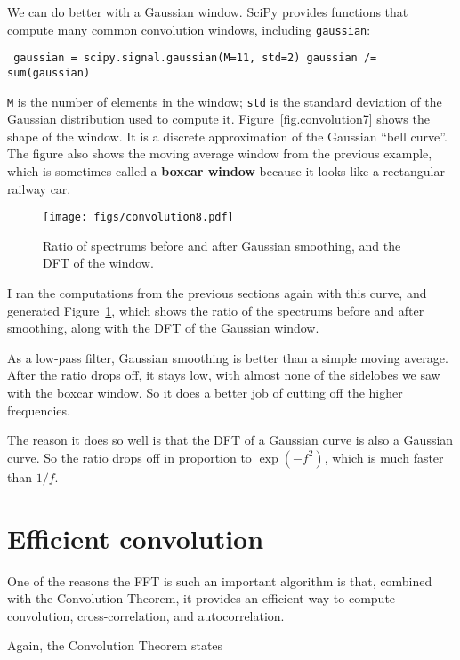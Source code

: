 \documentclass[12pt]{book} \usepackage[width=5.5in,height=8.5in, hmarginratio=3:2,vmarginratio=1:1]{geometry}
\begin{document}
We can do better with a Gaussian window. SciPy provides functions that compute many common convolution windows, including {\tt gaussian}: 

\begin{verbatim} gaussian = scipy.signal.gaussian(M=11, std=2) gaussian /= sum(gaussian) \end{verbatim} 

{\tt M} is the number of elements in the window; {\tt std} is the standard deviation of the Gaussian distribution used to compute it. Figure~\ref{fig.convolution7} shows the shape of the window. It is a discrete approximation of the Gaussian ``bell curve''. The figure also shows the moving average window from the previous example, which is sometimes called a {\bf boxcar window} because it looks like a rectangular railway car. 

\begin{figure} 

\centerline{\texttt{[image: figs/convolution8.pdf]}} \caption{Ratio of spectrums before and after Gaussian smoothing, and the DFT of the window.} \label{fig.convolution8} \end{figure} 

I ran the computations from the previous sections again with this curve, and generated Figure~\ref{fig.convolution8}, which shows the ratio of the spectrums before and after smoothing, along with the DFT of the Gaussian window. 

As a low-pass filter, Gaussian smoothing is better than a simple moving average. After the ratio drops off, it stays low, with almost none of the sidelobes we saw with the boxcar window. So it does a better job of cutting off the higher frequencies. 

The reason it does so well is that the DFT of a Gaussian curve is also a Gaussian curve. So the ratio drops off in proportion to $\exp(-f^2)$, which is much faster than $1/f$. 

\section{Efficient convolution} \label{effconv} 

One of the reasons the FFT is such an important algorithm is that, combined with the Convolution Theorem, it provides an efficient way to compute convolution, cross-correlation, and autocorrelation. 

Again, the Convolution Theorem states 
\end{document}
